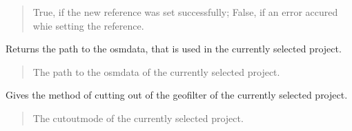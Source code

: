 \documentclass[letterpaper,10pt,english]{sphinxmanual}
\begin{document}
\begin{fulllineitems}
\begin{fulllineitems}
\begin{quote}
\begin{description}
\sphinxAtStartPar
True, if the new reference was set successfully; False, if an error accured whie setting the reference.

\sphinxAtStartPar
{}

\end{description}\end{quote}

\end{fulllineitems}


\begin{fulllineitems}
\label{\detokenize{apidoc/src.osm_configurator.control:src.osm_configurator.control.control.Control.get_osm_data_reference}}
\pysigstartsignatures
{}
\pysigstopsignatures
\sphinxAtStartPar
Returns the path to the osm\sphinxhyphen{}data, that is used in the currently selected project.
\begin{quote}\begin{description}
\sphinxAtStartPar
The path to the osm\sphinxhyphen{}data of the currently selected project.

\sphinxAtStartPar
{}

\end{description}\end{quote}

\end{fulllineitems}


\begin{fulllineitems}
\label{\detokenize{apidoc/src.osm_configurator.control:src.osm_configurator.control.control.Control.get_cut_out_mode}}
\pysigstartsignatures
{}
\pysigstopsignatures
\sphinxAtStartPar
Gives the method of cutting out of the geofilter of the currently selected project.
\begin{quote}\begin{description}
\sphinxAtStartPar
The cut\sphinxhyphen{}out\sphinxhyphen{}mode of the currently selected project.


\end{description}
\end{quote}
\end{fulllineitems}
\end{fulllineitems}
\end{document}

